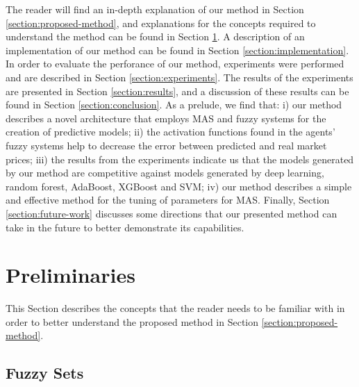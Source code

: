 \documentclass{ieeeaccess}
\begin{document}
The reader will find an in-depth explanation of our method in Section
\ref{section:proposed-method}, and explanations for the concepts
required to understand the method can be found in Section
\ref{section:preliminaries}. A description of an implementation of our method can be
found in Section \ref{section:implementation}. In order to evaluate
the perforance of our method, experiments were performed and are
described in Section \ref{section:experiments}. The results of the
experiments are presented in Section \ref{section:results}, and a
discussion of these results can be found in Section
\ref{section:conclusion}. As a prelude, we find that: i) our method
describes a novel architecture that employs MAS and fuzzy systems for
the creation of predictive models; ii) the activation functions found
in the agents' fuzzy systems help to decrease the error between
predicted and real market prices; iii) the results from the
experiments indicate us that the models generated by our method are
competitive against models generated by deep learning, random forest,
AdaBoost, XGBoost and SVM; iv) our method
describes a simple and effective method for the tuning of parameters
for MAS. Finally, Section \ref{section:future-work}
discusses some directions that our presented method can take in the
future to better demonstrate its capabilities.

\section{Preliminaries}
\label{section:preliminaries}
%

This Section describes the concepts that the reader needs to be familiar with in
order to better understand the proposed method in Section
\ref{section:proposed-method}.%
\subsection{Fuzzy Sets}
\label{subsection:fuzzy-sets}
\end{document}
